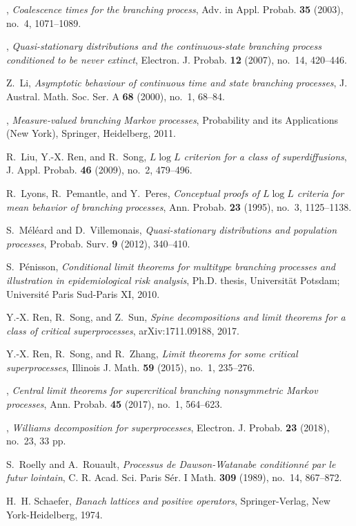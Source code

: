 \documentclass[12pt,a4paper]{amsart}
\theoremstyle{plain}
\theoremstyle{definition}
\numberwithin{equation}{section}
\begin{document}
\begin{thebibliography}{10}
\bysame, \emph{Coalescence times for the branching process}, Adv. in Appl.
  Probab. \textbf{35} (2003), no.~4, 1071--1089.

\bysame, \emph{Quasi-stationary distributions and the continuous-state
  branching process conditioned to be never extinct}, Electron. J. Probab.
  \textbf{12} (2007), no.~14, 420--446.

Z.~Li, \emph{Asymptotic behaviour of continuous time and state branching
  processes}, J. Austral. Math. Soc. Ser. A \textbf{68} (2000), no.~1, 68--84.

\bysame, \emph{Measure-valued branching {M}arkov processes}, Probability and
  its Applications (New York), Springer, Heidelberg, 2011.

R.~Liu, Y.-X. Ren, and R.~Song, \emph{{$L\log L$} criterion for a class of
  superdiffusions}, J. Appl. Probab. \textbf{46} (2009), no.~2, 479--496.

R.~Lyons, R.~Pemantle, and Y.~Peres, \emph{Conceptual proofs of {$L\log L$}
  criteria for mean behavior of branching processes}, Ann. Probab. \textbf{23}
  (1995), no.~3, 1125--1138.

S.~M\'{e}l\'{e}ard and D.~Villemonais, \emph{Quasi-stationary distributions and
  population processes}, Probab. Surv. \textbf{9} (2012), 340--410.

S.~P\'{e}nisson, \emph{Conditional limit theorems for multitype branching
  processes and illustration in epidemiological risk analysis}, Ph.D. thesis,
  Universit\"{a}t Potsdam; Universit\'{e} Paris Sud-Paris XI, 2010.

Y.-X. Ren, R.~Song, and Z.~Sun, \emph{Spine decompositions and limit theorems
  for a class of critical superprocesses}, arXiv:1711.09188, 2017.

Y.-X. Ren, R.~Song, and R.~Zhang, \emph{Limit theorems for some critical
  superprocesses}, Illinois J. Math. \textbf{59} (2015), no.~1, 235--276.

\bysame, \emph{Central limit theorems for supercritical branching nonsymmetric
  {M}arkov processes}, Ann. Probab. \textbf{45} (2017), no.~1, 564--623.

\bysame, \emph{Williams decomposition for superprocesses}, Electron. J. Probab.
  \textbf{23} (2018), no.~23, 33 pp.

S.~Roelly and A.~Rouault, \emph{Processus de {D}awson-{W}atanabe
  conditionn\'{e} par le futur lointain}, C. R. Acad. Sci. Paris S\'{e}r. I
  Math. \textbf{309} (1989), no.~14, 867--872.

H.~H. Schaefer, \emph{Banach lattices and positive operators}, Springer-Verlag,
  New York-Heidelberg, 1974.

\end{thebibliography}
\end{document}
